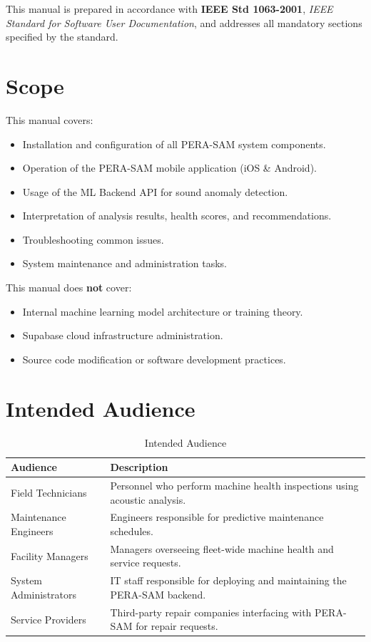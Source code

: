 \documentclass[10pt, a4paper, oneside]{report}
\begin{document}
This manual is prepared in accordance with \textbf{IEEE Std 1063-2001}, \textit{IEEE Standard for Software User Documentation}, and addresses all mandatory sections specified by the standard.

\section{Scope}
\label{sec:scope}

This manual covers:
\begin{itemize}[leftmargin=*, nosep]
  \item Installation and configuration of all PERA-SAM system components.
  \item Operation of the PERA-SAM mobile application (iOS \& Android).
  \item Usage of the ML Backend API for sound anomaly detection.
  \item Interpretation of analysis results, health scores, and recommendations.
  \item Troubleshooting common issues.
  \item System maintenance and administration tasks.
\end{itemize}

This manual does \textbf{not} cover:
\begin{itemize}[leftmargin=*, nosep]
  \item Internal machine learning model architecture or training theory.
  \item Supabase cloud infrastructure administration.
  \item Source code modification or software development practices.
\end{itemize}

\section{Intended Audience}
\label{sec:audience}

\begin{table}[H]
\centering
\caption{Intended Audience}
\label{tab:audience}
\begin{tabularx}{\textwidth}{l X}
  \toprule
  \textbf{Audience} & \textbf{Description} \\
  \midrule
  Field Technicians      & Personnel who perform machine health inspections using acoustic analysis. \\
  Maintenance Engineers  & Engineers responsible for predictive maintenance schedules. \\
  Facility Managers      & Managers overseeing fleet-wide machine health and service requests. \\
  System Administrators  & IT staff responsible for deploying and maintaining the PERA-SAM backend. \\
  Service Providers      & Third-party repair companies interfacing with PERA-SAM for repair requests. \\
  \bottomrule
\end{tabularx}
\end{table}
\end{document}
